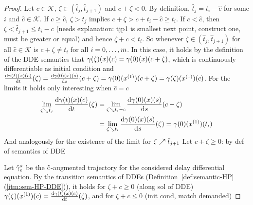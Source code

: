 \begin{proof}
        Let $c\in\mathcal{K}$, $\zeta\in(\hat{t}_j,\hat{t}_{j+1})$ and $c+\zeta<0$. By definition, $\hat{t}_j=t_i-\hat{c}$ for some $i$ and $\hat{c}\in\mathcal{K}$.
        If $c\geq\hat{c}$, $\zeta>\hat{t}_j$ implies $c+\zeta > c+t_i-\hat{c}\geq t_i$.
        If $c<\hat{c}$, then $\zeta < \hat{t}_{j+1} \leq t_i-c$ (needs explanation: tjp1 is smallest next point, construct one, must be greater or equal) and hence $\zeta+c<t_i$.
        So whenever $\zeta\in(\hat{t}_j,\hat{t}_{j+1})$ for all $\hat{c}\in\mathcal{K}$ is $c+\zeta\neq t_i$ for all $i=\range{0}{m}$.
        In this case, it holds by the definition of the DDE semantics that $\trajectory(\zeta)(x)(c)=\trajectory(0)(x)(c+\zeta)$, which is continuously differentiable as initial condition and $\DD{\trajectory(t)(x)(c)}{t}(\zeta)=\DD{\trajectory(0)(x)(s)}{s}(c+\zeta)=\trajectory(0)(\D{x})(c+\zeta)=\trajectory(\zeta)(\D{x})(c)$.
        For the limits it holds
        only interesting when $\hat{c}=c$
        \begin{align*}
            \lim_{\zeta\downto\hat{t}_j} \DD{\trajectory(t)(x)(c)}{t}(\zeta)
                & = \lim_{\zeta\downto t_i-c} \DD{\trajectory(0)(x)(s)}{s}(c+\zeta)\\
                & = \lim_{\zeta\downto t_i} \DD{\trajectory(0)(x)(s)}{s}(\zeta)
                = \trajectory(0)(\D{x})(t_i)
        \end{align*}
        And analogously for the existence of the limit for $\zeta\upto\hat{t}_{j+1}$
        Let $c+\zeta\geq 0$: by def of semantics of DDE


        Let $\augtrajectory[s]{\astrm}$ be the $\bstrm$-augmented trajectory for the considered delay differential equation.
        By the transition semantics of DDEs (Definition~\ref{def:semantic-HP}\,(\ref{itm:sem-HP-DDE})), it holds for $\zeta+c\geq 0$ (along sol of DDE)
        $\trajectory(\zeta)(\D{x})(c) = \DD{\trajectory(t)(x)(c)}{t}(\zeta)$, and for $\zeta+c\leq 0$ (init cond, match demanded)


\end{proof}
